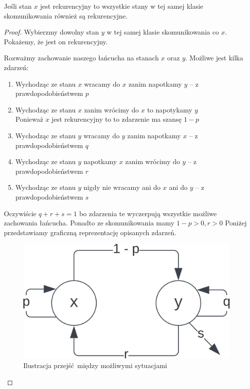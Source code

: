 \begin{lemma}
	Jeśli stan \(x\) jest rekurencyjny to
	wszystkie stany w tej samej klasie skomunikowania również są rekurencyjne.
\end{lemma}
\begin{proof}
	Wybierzmy dowolny stan \( y \) w tej samej klasie skomunikowania co \( x \).
	Pokażemy, że jest on rekurencyjny.

	Rozważmy zachowanie naszego łańcucha na stanach \( x \) oraz \( y \).
	Możliwe jest kilka zdarzeń:
	\begin{enumerate}
		\item Wychodząc ze stanu \( x \) wracamy do \( x \) zanim napotkamy \( y \) -- z prawdopodobieństwem \( p \)

		\item Wychodząc ze stanu \( x \) zanim wrócimy do \( x \) to napotykamy \( y \) \\
		      Ponieważ \( x \) jest rekurencyjny to to zdarzenie ma szansę \( 1 - p \)

		\item Wychodząc ze stanu \( y \) wracamy do \( y \) zanim napotkamy \( x \) -- z prawdopodobieństwem \( q \)
		\item Wychodząc ze stanu \( y \) napotkamy \( x \) zanim wrócimy do \( y \) -- z prawdopodobieństwem \( r \)

		\item Wychodząc ze stanu \( y \) nigdy nie wracamy ani do \( x \) ani do \( y \) -- z prawdopodobieństwem \( s \)
	\end{enumerate}
	Oczywiście \( q + r + s = 1 \) bo zdarzenia te wyczerpują wszystkie możliwe zachowania łańcucha.
	Ponadto ze skomunikowania mamy \( 1 - p > 0, r > 0 \)
	Poniżej przedstawiamy graficzną reprezentację opisanych zdarzeń.

	\begin{figure}[H]
		\centering
		\includegraphics{img/markov-chains/recurrent-communicated-a-priori.png}
		\caption{Ilustracja przejść między możliwymi sytuacjami}
	\end{figure}


\end{proof}
